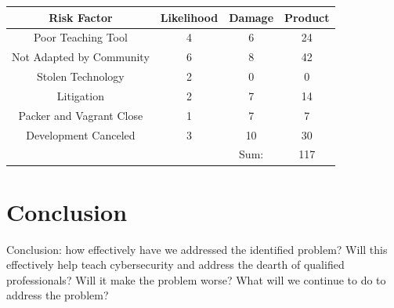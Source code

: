 \documentclass[openright]{report}
\begin{document}
\begin{center}
    \begin{tabular}{c | c | c | c} 
        \hline
        Risk Factor & Likelihood & Damage & Product \\ [0.5ex] 
        \hline\hline
        Poor Teaching Tool & 4 & 6 & 24 \\ 
        \hline
        Not Adapted by Community& 6 & 8 & 42 \\
        \hline
        Stolen Technology & 2 & 0 & 0 \\
        \hline
        Litigation & 2 & 7 & 14 \\
        \hline
        Packer and Vagrant Close & 1 & 7 & 7 \\
        \hline
        Development Canceled & 3 & 10 & 30 \\
        \hline
         &  & Sum: & 117 \\ [1ex] 
    \end{tabular}
\end{center}

\chapter{Conclusion}

\par Conclusion: how effectively have we addressed the identified problem? Will this effectively help teach cybersecurity and address the dearth of qualified professionals? Will it make the problem worse? What will we continue to do to address the problem?
\end{document}
